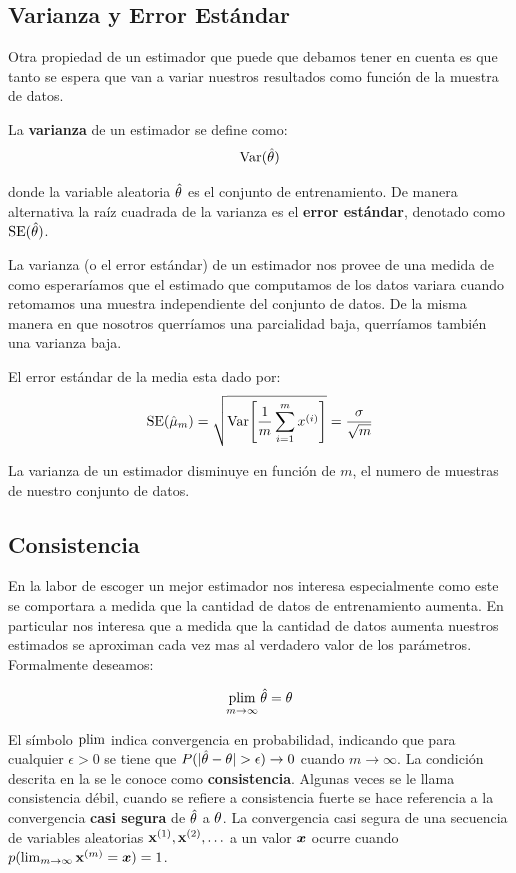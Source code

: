 \subsection{Varianza y Error Estándar}
Otra propiedad de un estimador que puede que debamos tener en cuenta es que tanto se espera que van a variar nuestros resultados como función de la muestra de datos.

La \textbf{varianza} de un estimador se define como:
\begin{equation}
  \mathrm{Var}(\hat{{\mathbf{\theta}}})
\end{equation}

donde la variable aleatoria $\hat{{\mathbf{\theta}}}$ es el conjunto de entrenamiento. De manera alternativa la raíz cuadrada de la varianza es el \textbf{error estándar}, denotado como $\mathrm{SE}(\hat{{\mathbf{\theta}}})$.

La varianza (o el error estándar) de un estimador nos provee de una medida de como esperaríamos que el estimado que computamos de los datos variara cuando retomamos una muestra independiente del conjunto de datos. De la misma manera en que nosotros querríamos una parcialidad baja, querríamos también una varianza baja.

El error estándar de la media esta dado por:
\begin{equation}
  \mathrm{SE}(\hat{\mu}_m) = \sqrt{ \mathrm{Var}{\Bigg[ \frac{1}{m} \sum_{i=1}^{m} x^{(i)} \Bigg]} } = \frac{\sigma}{\sqrt{m}}
\end{equation}
    
La varianza de un estimador disminuye en función de $m$, el numero de muestras de nuestro conjunto de datos.

\subsection{Consistencia} \label{app:consistency}
En la labor de escoger un mejor estimador nos interesa especialmente como este se comportara a medida que la cantidad de datos de entrenamiento aumenta. En particular nos interesa que a medida que la cantidad de datos aumenta nuestros estimados se aproximan cada vez mas al verdadero valor de los parámetros. Formalmente deseamos:

\begin{equation} \label{eq:consistency}
  \operatorname*{plim}_{m\to\infty} \hat{{\mathbf{\theta}}} = {\mathbf{\theta}}
\end{equation}

El símbolo $\operatorname*{plim}$ indica convergencia en probabilidad, indicando que para cualquier $\epsilon > 0$ se tiene que $P(|\hat{{\mathbf{\theta}}} - {\mathbf{\theta}}| > \epsilon) \to 0$ cuando $m \to \infty$. La condición descrita en la  se le conoce como \textbf{consistencia}. Algunas veces se le llama consistencia débil, cuando se refiere a consistencia fuerte se hace referencia a la convergencia \textbf{casi segura} de $\hat{{\mathbf{\theta}}}$ a ${\mathbf{\theta}}$. La convergencia casi segura de una secuencia de variables aleatorias ${\mathbf{x}}^{(1)}, {\mathbf{x}}^{(2)}, \ldots$ a un valor ${\bm{x}}$ ocurre cuando $p(\lim_{m\to\infty}{\mathbf{x}}^{(m)} = {\bm{x}}) = 1$.

